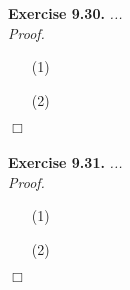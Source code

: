 \documentclass{article}
\begin{document}



\textbf{Exercise 9.30.}
\emph{...} \\

\emph{Proof.}
\begin{enumerate}
\item[(1)]
\item[(2)]

\end{enumerate}
$\Box$ \\\\






\textbf{Exercise 9.31.}
\emph{...} \\

\emph{Proof.}
\begin{enumerate}
\item[(1)]
\item[(2)]

\end{enumerate}
$\Box$ \\\\



\end{document}
